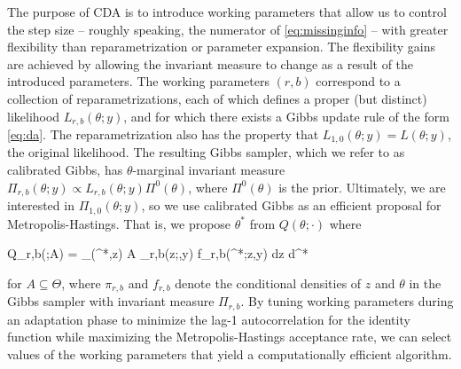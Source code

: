 \documentclass[10pt]{article}
\newcommand{\be}{\begin{equs}}
\newcommand{\ee}{\end{equs}}
\newcommand{\mc}[1]{\mathcal{#1}}
\begin{document}
The purpose of CDA is to introduce working parameters that allow us to control the step size -- roughly speaking, the numerator of \eqref{eq:missinginfo} -- with greater flexibility than reparametrization or parameter expansion. The flexibility gains are achieved by allowing the invariant measure to change as a result of the introduced parameters. The working parameters $(r,b)$ correspond to a collection of reparametrizations, each of which defines a proper (but distinct) likelihood $L_{r,b}(\theta;y)$, and for which there exists a Gibbs update rule of the form \eqref{eq:da}. The reparametrization also has the property that $L_{1,0}(\theta;y) = L(\theta;y)$, the original likelihood. The resulting Gibbs sampler, which we refer to as calibrated Gibbs, has $\theta$-marginal invariant measure $\Pi_{r,b}(\theta;y) \propto L_{r,b}(\theta;y) \Pi^0(\theta)$, where $\Pi^0(\theta)$ is the prior. Ultimately, we are interested in $\Pi_{1,0}(\theta;y)$, so we use calibrated Gibbs as an efficient proposal for Metropolis-Hastings. That is, we propose $\theta^*$ from $Q(\theta;\cdot)$ where
\be \label{eq:Q}
Q_{r,b}(\theta;A) = \int_{(\theta^*,z) \in A \times \mc Z} \pi_{r,b}(z;\theta,y) f_{r,b}(\theta^*;z,y) dz d\theta^*
\ee
for $A \subseteq \Theta$, where $\pi_{r,b}$ and $f_{r,b}$ denote the conditional densities of $z$ and $\theta$ in the Gibbs sampler with invariant measure $\Pi_{r,b}$. By tuning working parameters during an adaptation phase to minimize the lag-1 autocorrelation for the identity function while maximizing the Metropolis-Hastings acceptance rate, we can select values of the working parameters that yield a computationally efficient algorithm.
\end{document}
